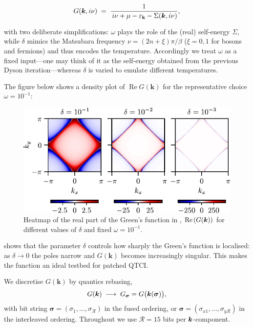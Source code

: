 \begin{equation}
  G(\boldsymbol{k},i\nu)
  \;=\;
  \frac{1}
       {\,i\nu+\mu-\varepsilon_{\mathbf{k}}-\Sigma(\boldsymbol{k},i\nu)},
\end{equation}

with two deliberate simplifications:
\(\omega\) plays the role of the (real) self-energy
\(\Sigma\), while \(\delta\) mimics the Matsubara frequency
\(\nu=(2n+\xi)\pi/\beta\) ($\xi=0,1$ for bosons and fermions) and thus encodes the temperature.
Accordingly we treat \(\omega\) as a fixed input—one may think of it as the self-energy obtained from the previous Dyson iteration—whereas \(\delta\) is varied to emulate different temperatures.

The figure below shows a density plot of
\(\operatorname{Re}G(\mathbf{k})\) for the representative choice
\(\omega=10^{-1}\):

\begin{figure}[ht!]
    \centering
    \includegraphics{figures/realGreenHeatmap.pdf}
    \caption{Heatmap of the real part of the Green's function in , $\text{Re}\left(G(\boldsymbol{k})\right)$ for different values of $\delta$ and fixed $\omega=10^{-1}$. }
    \label{fig:realGreenHeatmap}
\end{figure}

 shows that the parameter \(\delta\) controls how sharply the Green’s function is localised: as \(\delta\to 0\) the poles narrow and \(G(\mathbf{k})\) becomes increasingly singular.  This makes the function an ideal testbed for patched QTCI.

We discretise \(G(\mathbf{k})\) by quantics rebasing,  
\begin{equation}
  G(\boldsymbol{k})
  \;\longrightarrow\;
  G_{\boldsymbol{\sigma}} = G \bigl(\boldsymbol{k}(\boldsymbol{\sigma})\bigr),
\end{equation}
with bit string
\(\boldsymbol{\sigma}=(\sigma_{1},\dots,\sigma_{\mathcal R})\) in the fused
ordering, or \(\boldsymbol{\sigma}=(\sigma_{x1},\dots,\sigma_{y\mathcal R})\) in the interleaved ordering.  
Throughout we use \(\mathcal R=15\) bits per \(\boldsymbol{k}\)-component.

